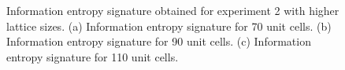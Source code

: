 \documentclass[fleqn,10pt]{wlscirep}
\begin{document}
\begin{figure}
\centering
{}
\caption{Information entropy signature obtained for experiment 2 with higher lattice sizes. (a) Information entropy signature for 70 unit cells. (b) Information entropy signature for 90 unit cells. (c) Information entropy signature for 110 unit cells.}
\label{feature_importances_ssh2_longer_lattices}
\end{figure}
\end{document}
